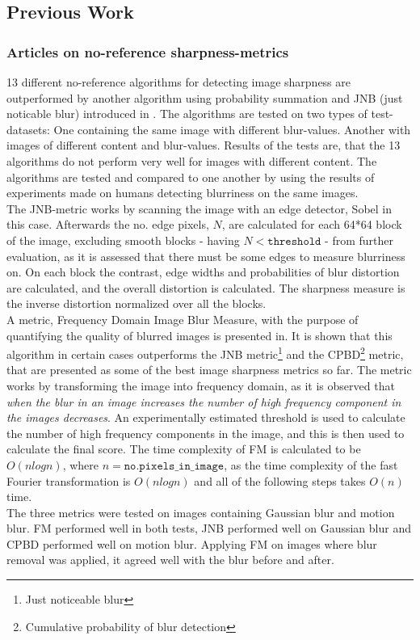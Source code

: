 \subsection{Previous Work}
\subsubsection{Articles on no-reference sharpness-metrics}
13 different no-reference algorithms for detecting image sharpness are outperformed by another algorithm using probability summation and JNB (just noticable blur) introduced in \cite{JNB}. The algorithms are tested on two types of test-datasets: One containing the same image with different blur-values. Another with images of different content and blur-values. Results of the tests are, that the 13 algorithms do not perform very well for images with different content. The algorithms are tested and compared to one another by using the results of experiments made on humans detecting blurriness on the same images.\\
The JNB-metric works by scanning the image with an edge detector, Sobel in this case. Afterwards the no. edge pixels, $N$, are calculated for each 64*64 block of the image, excluding smooth blocks - having $N<\texttt{threshold}$ - from further evaluation, as it is assessed that there must be some edges to measure blurriness on. On each block the contrast, edge widths and probabilities of blur distortion are calculated, and the overall distortion is calculated. The sharpness measure is the inverse distortion normalized over all the blocks.\\

A metric, Frequency Domain Image Blur Measure, with the purpose of quantifying the quality of blurred images is presented in\cite{FM}. It is shown that this algorithm in certain cases outperforms the JNB metric\cite{JNB}\footnote{Just noticeable blur} and the CPBD\cite{CPBD}\footnote{Cumulative probability of blur detection} metric, that are presented as some of the best image sharpness metrics so far. The metric works by transforming the image into frequency domain, as it is observed that \textit{when the blur in an image increases the number of high frequency component in the images decreases}\cite{FM}. An experimentally estimated threshold is used to calculate the number of high frequency components in the image, and this is then used to calculate the final score.
The time complexity of FM is calculated to be $O(nlogn)$, where  $n = \texttt{no.pixels\_in\_image}$, as the time complexity of the fast Fourier transformation is $O(nlogn)$ and all of the following steps takes $O(n)$ time.\\
The three metrics were tested on images containing Gaussian blur and motion blur. FM performed well in both tests, JNB performed well on Gaussian blur and CPBD performed well on motion blur. Applying FM on images where blur removal was applied, it agreed well with the blur before and after.\\

